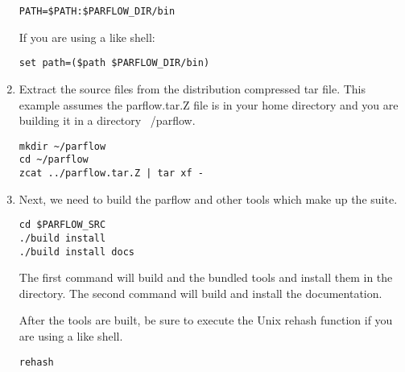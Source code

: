 \begin{enumerate}
\begin{display}\begin{verbatim}
PATH=$PATH:$PARFLOW_DIR/bin
\end{verbatim}\end{display}

If you are using a  like shell:

\begin{display}\begin{verbatim}
set path=($path $PARFLOW_DIR/bin)
\end{verbatim}\end{display}


\item

Extract the source files from the distribution compressed tar file.
This example assumes the parflow.tar.Z file is in your home directory
and you are building it in a directory ~/parflow.

\begin{display}\begin{verbatim}
mkdir ~/parflow
cd ~/parflow
zcat ../parflow.tar.Z | tar xf -
\end{verbatim}\end{display}


\item
Next, we need to build the parflow and other tools which make up the
\parflow{} suite.  

\begin{display}\begin{verbatim}
cd $PARFLOW_SRC
./build install 
./build install docs
\end{verbatim}\end{display}

The first command will build \parflow{} and the bundled tools and
install them in the  directory.  The second
command will build and install the documentation.

After the tools are built, be sure to execute the Unix rehash function 
if you are using a  like shell.

\begin{display}\begin{verbatim}
rehash
\end{verbatim}\end{display}


\end{enumerate}

